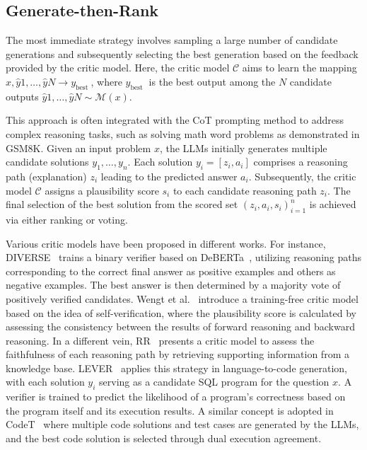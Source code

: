 \documentclass[a4paper,oneside]{book}
\begin{document}
\subsection{Generate-then-Rank}
The most immediate strategy involves sampling a large number of candidate generations and subsequently selecting the best generation based on the feedback provided by the critic model. Here, the critic model $\mathcal{C}$ aims to learn the mapping $x, \hat{y}{1}, \ldots, \hat{y}{N} \rightarrow y_{\text {best }}$, where $y_{\text {best }}$ is the best output among the $N$ candidate outputs $\hat{y}{1}, \ldots, \hat{y}{N} \sim \mathcal{M}(x)$.

This approach is often integrated with the CoT prompting method to address complex reasoning tasks, such as solving math word problems as demonstrated in GSM8K. Given an input problem $x$, the LLMs initially generates multiple candidate solutions $y_{1}, \ldots, y_{n}$. Each solution $y_{i}=\left[z_{i}, a_{i}\right]$ comprises a reasoning path (explanation) $z_{i}$ leading to the predicted answer $a_{i}$. Subsequently, the critic model $\mathcal{C}$ assigns a plausibility score $s_{i}$ to each candidate reasoning path $z_{i}$. The final selection of the best solution from the scored set $\left(z_{i}, a_{i}, s_{i}\right)_{i=1}^{n}$ is achieved via either ranking or voting.

Various critic models have been proposed in different works. For instance, DIVERSE~\cite{li-etal-2023-making} trains a binary verifier based on DeBERTa~\cite{he2021deberta}, utilizing reasoning paths corresponding to the correct final answer as positive examples and others as negative examples. The best answer is then determined by a majority vote of positively verified candidates. Wengt et al.~\cite{weng2023large} introduce a training-free critic model based on the idea of self-verification, where the plausibility score is calculated by assessing the consistency between the results of forward reasoning and backward reasoning. In a different vein, RR~\cite{he2022rethinking} presents a critic model to assess the faithfulness of each reasoning path by retrieving supporting information from a knowledge base. LEVER~\cite{ni2023lever} applies this strategy in language-to-code generation, with each solution $y_{i}$ serving as a candidate SQL program for the question $x$. A verifier is trained to predict the likelihood of a program's correctness based on the program itself and its execution results. A similar concept is adopted in CodeT~\cite{chen2022codet} where multiple code solutions and test cases are generated by the LLMs, and the best code solution is selected through dual execution agreement.
\end{document}
